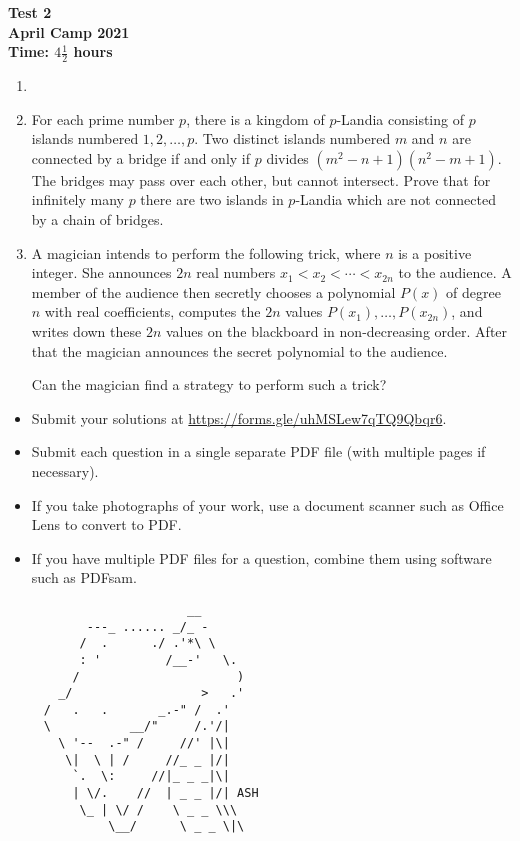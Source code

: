 \documentclass{article}
\begin{document}
\thispagestyle{empty}

\begin{center}
  \textbf{\Large Test 2}
  \\ \vspace{1em}
  \textbf{\large April Camp 2021}
  \\ \vspace{1em}
  \textbf{\large Time: $4\frac{1}{2}$ hours}
\end{center}

\vfill

\begin{enumerate}[leftmargin=0pt, itemsep=18pt]

\item


\item %
For each prime number $p$, there is a kingdom of $p$-Landia consisting of $p$ islands numbered $1, 2, \dotsc, p$.
Two distinct islands numbered $m$ and $n$ are connected by a bridge if and only if $p$ divides $(m^2-n+1) (n^2-m+1)$.
The bridges may pass over each other, but cannot intersect.
Prove that for infinitely many $p$ there are two islands in $p$-Landia which are not connected by a chain of bridges.


\item %
A magician intends to perform the following trick, where $n$ is a positive integer.
She announces $2n$ real numbers $x_1 < x_2 < \dotsb < x_{2n}$ to the audience.
A member of the audience then secretly chooses a polynomial $P(x)$ of degree $n$ with real coefficients, computes the $2n$ values $P(x_1), \dotsc, P(x_{2n})$, and writes down these $2n$ values on the blackboard in non-decreasing order.
After that the magician announces the secret polynomial to the audience.

Can the magician find a strategy to perform such a trick?

\end{enumerate}


\vfill
\vfill
\begin{itemize}
	\item Submit your solutions at \url{https://forms.gle/uhMSLew7qTQ9Qbqr6}.
	\item Submit each question in a single separate PDF file (with multiple pages if necessary).
	\item If you take photographs of your work, use a document scanner such as Office Lens to convert to PDF.
	\item If you have multiple PDF files for a question, combine them using software such as PDFsam.
\end{itemize}

\vfill
\centering
\begin{BVerbatim}
                         __
           ---_ ...... _/_ -
          /  .      ./ .'*\ \
          : '         /__-'   \.
         /                      )
       _/                  >   .'
     /   .   .       _.-" /  .'
     \           __/"     /.'/|
       \ '--  .-" /     //' |\|
        \|  \ | /     //_ _ |/|
         `.  \:     //|_ _ _|\|
         | \/.    //  | _ _ |/| ASH
          \_ | \/ /    \ _ _ \\\
              \__/      \ _ _ \|\
\end{BVerbatim}
\end{document}
